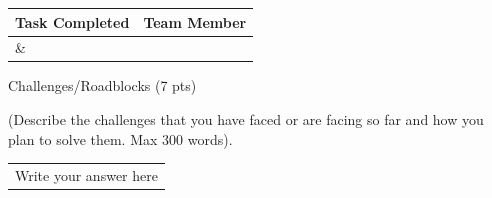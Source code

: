 \documentclass[12pt,a4paper]{article}
\newcommand{\sectiontitle}[1]{%
    {\color{GEUBlue}
    \fontsize{18}{22}\selectfont #1}
}
\newcommand{\instruction}[1]{%
    {\color{InstructionGrey}
    \fontsize{10.5}{13}\selectfont #1}
}
\newcommand{\answerbox}[2]{%
    \begin{tabularx}{\textwidth}{
        |>{\raggedright\arraybackslash}X|}
        \hline
        \parbox[t][#1][t]{\dimexpr\linewidth-12pt\relax}{
            \vspace{5pt}
            \fontsize{11}{13}\selectfont #2
        }\\
        \hline
    \end{tabularx}
}
\begin{document}
\begin{tabularx}{\textwidth}{
|>{\raggedright\arraybackslash}X
|>{\raggedright\arraybackslash}X|
}
\hline

\textbf{Task Completed} &
\textbf{Team Member}
\\
\hline

\parbox[t][3.25cm][t]{\linewidth}{}
&
\parbox[t][3.25cm][t]{\linewidth}{}
\\
\hline

\end{tabularx}

\vspace{0.65cm}

\sectiontitle{Challenges/Roadblocks (7 pts)}

\vspace{0.05cm}

\instruction{
(Describe the challenges that you have faced or are facing so far
and how you plan to solve them. Max 300 words).
}

\vspace{0.18cm}

\answerbox{4.05cm}{Write your answer here}

\vspace{0.65cm}










\end{document}
